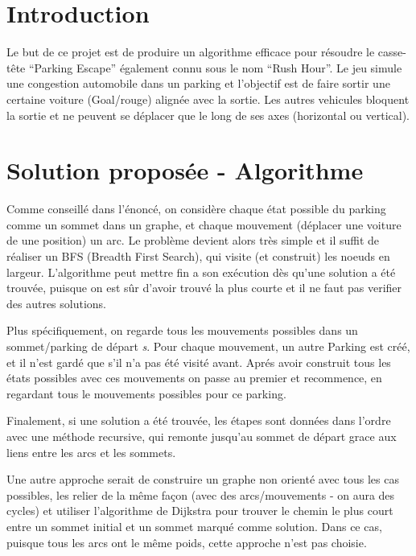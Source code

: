 \documentclass[11pt,a4paper]{article}
\begin{document}
\pagestyle{fancy}


\section{Introduction}

Le but de ce projet est de produire un algorithme efficace pour
résoudre le casse-tête ``Parking Escape'' également connu sous le nom
``Rush Hour''. Le jeu simule une congestion automobile dans un parking
et l'objectif est de faire sortir une certaine voiture (Goal/rouge)
alignée avec la sortie. Les autres vehicules bloquent la sortie et ne
peuvent se déplacer que le long de ses axes (horizontal ou vertical).

\section{Solution proposée - Algorithme}

Comme conseillé dans l'énoncé, on considère chaque état possible du
parking comme un sommet dans un graphe, et chaque mouvement (déplacer
une voiture de une position) un arc. Le problème devient alors très
simple et il suffit de réaliser un BFS (Breadth First Search), qui
visite (et construit) les noeuds en largeur. L'algorithme peut mettre
fin a son exécution dès qu'une solution a été trouvée, puisque on est
sûr d'avoir trouvé la plus courte et il ne faut pas verifier des
autres solutions.

\medbreak

Plus spécifiquement, on regarde tous les mouvements possibles dans un
sommet/parking de départ \emph{s}. Pour chaque mouvement, un autre
Parking est créé, et il n'est gardé que s'il n'a pas été visité
avant. Aprés avoir construit tous les états possibles avec ces
mouvements on passe au premier et recommence, en regardant tous le
mouvements possibles pour ce parking.

\medbreak

Finalement, si une solution a été trouvée, les étapes sont données
dans l'ordre avec une méthode recursive, qui remonte jusqu'au sommet
de départ grace aux liens entre les arcs et les sommets.

\medbreak

Une autre approche serait de construire un graphe non orienté avec
tous les cas possibles, les relier de la même façon (avec des
arcs/mouvements - on aura des cycles) et utiliser l'algorithme de
Dijkstra pour trouver le chemin le plus court entre un sommet initial
et un sommet marqué comme solution. Dans ce cas, puisque tous les arcs
ont le même poids, cette approche n'est pas choisie.
\end{document}
